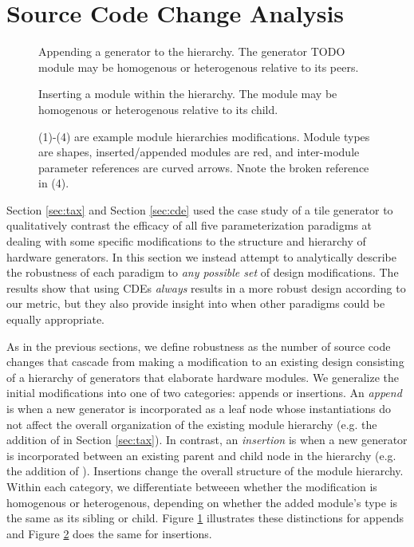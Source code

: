 \section{Source Code Change Analysis}
\label{sec:scca}

\begin{figure}
\centering
{}
\caption{Appending a generator to the hierarchy.
The generator TODO module may be homogenous or heterogenous relative to its peers.}
\label{fig:hc}
\end{figure}

\begin{figure}
\centering
{}
\caption{Inserting a module within the hierarchy.
The module may be homogenous or heterogenous relative to its child.}
\label{fig:vc}
\end{figure}

\begin{figure}
\centering
{}
\caption{(1)-(4) are example module hierarchies modifications. 
Module types are shapes, inserted/appended modules are red, and inter-module parameter references are curved arrows.
Nnote the broken reference in (4).}
\label{fig:attr}
\end{figure}

Section \ref{sec:tax} and Section \ref{sec:cde} used the case study of a tile generator to qualitatively contrast the efficacy of all five parameterization paradigms
at dealing with some specific modifications to the structure and hierarchy of hardware generators.
In this section we instead attempt to analytically describe the robustness of each paradigm to \textit{any possible set} of design modifications.
The results show that using CDEs \textit{always} results in a more robust design according to our metric,
but they also provide insight into when other paradigms could be equally appropriate.

As in the previous sections, we define robustness as the number of source code changes that cascade from making a modification to an existing design
consisting of a hierarchy of generators that elaborate hardware modules.
We generalize the initial modifications into one of two categories: appends or insertions.
An \emph{append} is when a new generator is incorporated as a leaf node whose instantiations do not affect the overall organization of the existing module hierarchy
(e.g. the addition of  in Section \ref{sec:tax}).
In contrast, an \emph{insertion} is when a new generator is incorporated between an existing parent and child node in the hierarchy (e.g. the addition of ). 
Insertions change the overall structure of the module hierarchy.
Within each category, we differentiate betweeen whether the modification is homogenous or heterogenous, depending on whether the added module's type is the same as its sibling or child.
Figure \ref{fig:hc} illustrates these distinctions for appends and Figure \ref{fig:vc} does the same for insertions.

